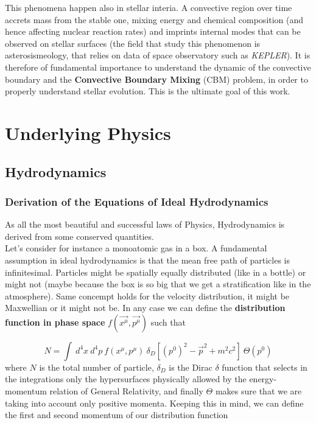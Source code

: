 \documentclass[11pt]{article}
\numberwithin{equation}{section}
\begin{document}
This phenomena happen also in stellar interia. A convective region over time accrets mass from the stable one, mixing energy and chemical composition (and hence affecting nuclear reaction rates) and imprints internal modes that can be observed on stellar surfaces (the field that study this phenomenon is asterosismeology, that relies on data of space observatory such as \textit{KEPLER}). It is therefore of fundamental importance to understand the dynamic of the convective boundary and the \textbf{Convective Boundary Mixing} (CBM) problem, in order to properly understand stellar evolution. This is the ultimate goal of this work.

\section{Underlying Physics}
\subsection{Hydrodynamics}
\subsubsection{Derivation of the Equations of Ideal Hydrodynamics}
As all the most beautiful and successful laws of Physics, Hydrodynamics is derived from some conserved quantities. \\
Let's consider for instance a monoatomic gas in a box. A fundamental assumption in ideal hydrodynamics is that the mean free path of particles is infinitesimal. Particles might be spatially equally distributed (like in a bottle) or might not (maybe because the box is so big that we get a stratification like in the atmosphere). Same concempt holds for the velocity distribution, it might be Maxwellian or it might not be. 
In any case we can define the \textbf{distribution function in phase space} $f( \vec{x^{\mu}}, \vec{p^{\mu}})$ such that

$$N=\int \ d^4x \ d^4p \ f( x^{\mu}, p^{\mu}) \  \delta_D[(p^0)^2-\vec{p}^2+m^2c^2] \  \Theta(p^0)$$ 
 where $N$ is the total number of particle, $\delta_D$ is the Dirac $\delta$ function that selects in the integrations only the hypersurfaces physically allowed by the energy-momentum relation of General Relativity, and finally $\Theta$ makes sure that we are taking into account only positive momenta. 
Keeping this in mind, we can define the first and second momentum of our distribution function
\end{document}
